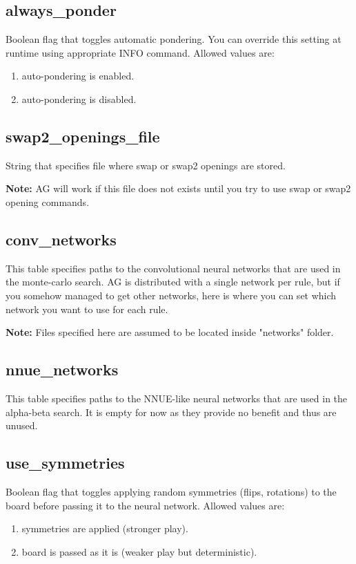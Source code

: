 \documentclass[12pt,a4paper]{article}
\begin{document}
\subsection{always{\_}ponder}
Boolean flag that toggles automatic pondering. You can override this setting at runtime using appropriate INFO command. Allowed values are:
\begin{enumerate}[leftmargin=7.5em]
	\item[\text{"true"}]{auto-pondering is enabled.}
	\item[\text{"false"}]{auto-pondering is disabled.}
\end{enumerate}


\subsection{swap2{\_}openings{\_}file}
String that specifies file where swap or swap2 openings are stored.

\textbf{Note:} AG will work if this file does not exists until you try to use swap or swap2 opening commands.

\subsection{conv{\_}networks}
This table specifies paths to the convolutional neural networks that are used in the monte-carlo search. AG is distributed with a single network per rule, but if you somehow managed to get other networks, here is where you can set which network you want to use for each rule.

\textbf{Note:} Files specified here are assumed to be located inside "networks" folder.

\subsection{nnue{\_}networks}
This table specifies paths to the NNUE-like neural networks that are used in the alpha-beta search. It is empty for now as they provide no benefit and thus are unused.

\subsection{use{\_}symmetries}
Boolean flag that toggles applying random symmetries (flips, rotations) to the board before passing it to the neural network. Allowed values are:
\begin{enumerate}[leftmargin=7.5em]
	\item[\text{"true"}]{symmetries are applied (stronger play).}
	\item[\text{"false"}]{board is passed as it is (weaker play but deterministic).}
\end{enumerate}
\end{document}
